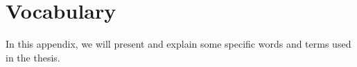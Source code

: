 \chapter{Vocabulary}
In this appendix, we will present and explain some specific words and terms used in the thesis.
